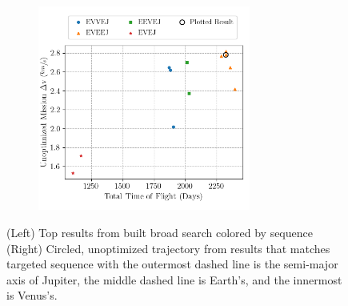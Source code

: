 \documentclass[letterpaper, paper,11pt]{AAS}	%
\begin{document}
\begin{figure}[htb]
    \begin{subfigure}
        \centering\includegraphics[width=2.75in]{./fig/galileoResults.png}
    \end{subfigure}
    \begin{subfigure}
        \centering
    \end{subfigure}
    \caption{(Left) Top results from built broad search colored by sequence\hspace{1em} (Right) Circled, unoptimized trajectory from results that matches targeted sequence \cite{DAmario1992} with the outermost dashed line is the semi-major axis of Jupiter, the middle dashed line is Earth's, and the innermost is Venus's.}
    \label{fig:galiResults}
\end{figure}
\end{document}
